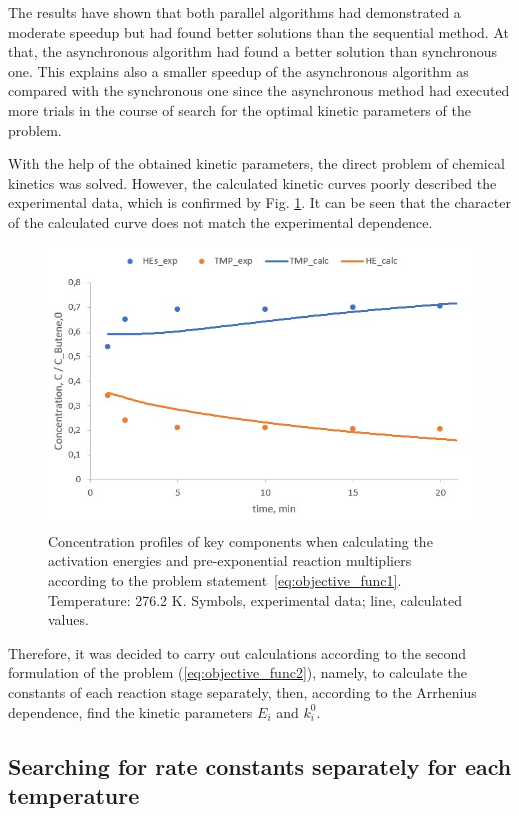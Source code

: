 \documentclass{svproc}
\begin{document}
The results have shown that both parallel algorithms had demonstrated a moderate speedup but had found better solutions than the sequential method. At that, the asynchronous algorithm had found a better solution than synchronous one. This explains also a smaller speedup of the asynchronous algorithm as compared with the synchronous one since the asynchronous method had executed more trials in the course of search for the optimal kinetic parameters of the problem.

With the help of the obtained kinetic parameters, the direct problem of chemical kinetics was solved. However, the calculated kinetic curves poorly described the experimental data, which is confirmed by Fig. \ref{fig:res1}. It can be seen that the character of the calculated curve does not match the experimental dependence.

\begin{figure}
\begin{center}
  \includegraphics[width=0.7\linewidth]{res1.jpg}
  \caption{Concentration profiles of key components when calculating the activation energies and pre-exponential reaction multipliers according to the problem statement~\ref{eq:objective_func1}. Temperature: 276.2 K. Symbols, experimental data; line, calculated values.}
  \label{fig:res1}  
\end{center}
\end{figure}

Therefore, it was decided to carry out calculations according to the second formulation of the problem (\ref{eq:objective_func2}), namely, to calculate the constants of each reaction stage separately, then, according to the Arrhenius dependence, find the kinetic parameters $E_i$ and $k_i^0$.

\subsection{Searching for rate constants separately for each temperature}
\end{document}

